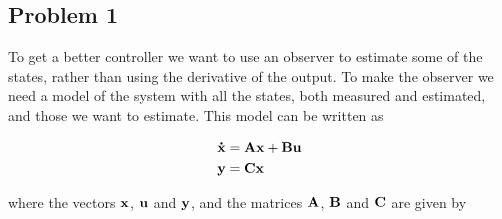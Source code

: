 \subsection{Problem 1}
To get a better controller we want to use an observer to estimate some of the states, rather than using the derivative of the output. To make the observer we need a model of the system with all the states, both measured and estimated, and those we want to estimate. This model can be written as

\begin{subequations}
	\begin{align*}
		\mathbf{\dot x} &= \mathbf{A}\mathbf{x} + \mathbf{B}\mathbf{u}\\
		\mathbf{y} &= \mathbf{C}\mathbf{x}
	\end{align*}
\end{subequations}

where the vectors $\mathbf{x}$, $\mathbf{u}$ and $\mathbf{y}$, and the matrices $\mathbf{A}$, $\mathbf{B}$ and $\mathbf{C}$ are given by


